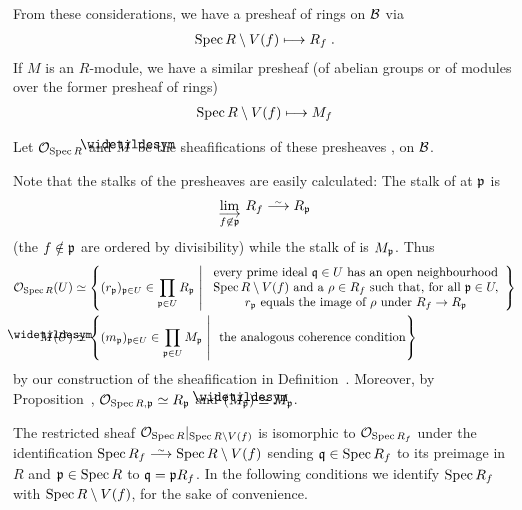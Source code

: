 \documentclass[a4paper,parskip=half,numbers=enddot, DIV=12]{scrreprt}
\begin{document}
From these considerations, we have a presheaf of rings on $\mathcal{B}$ via
\begin{align}\lbl{eq:SpecRingLoc}
    \Spec R\setminus V(f) \longmapsto R_f\;.
\end{align}
If $M$ is an $R$-module, we have a similar presheaf (of abelian groups or of modules over the former presheaf of rings)
\begin{align} \lbl{eq:SpecModuleLoc}
    \Spec R\setminus V(f) \longmapsto M_f
\end{align}
\begin{defi}
    Let $\mathcal{O}_{\operatorname{Spec} R}$ and $\snake M$ be the sheafifications of these presheaves ,  on $\mathcal{B}$.
\end{defi}
\begin{rem*}
    Note that the stalks of the presheaves are easily calculated: The stalk of  at $\mathfrak{p}$ is 
    \begin{align*}
        \colimit[f\not \in \pp] R_f \isomorphism R_\pp
    \end{align*}
    (the $f\notin\mathfrak{p}$ are ordered by divisibility) while the stalk of  is $M_{\mathfrak{p}}$. Thus
    \begin{align*}
        \Oo_{\Spec R}(U) &\simeq \left\{(r_\pp)_{\pp\in U}\in \prod_{\pp\in U} R_\pp \st
        \begin{array}{c}
	         \text{every prime ideal } \qq\in U \text{ has an open neighbourhood}\\
	         \Spec R\setminus V(f) \text{ and a } \rho \in R_f\text{ such that, for all }\pp\in U,
	          \\r_\pp\text{ equals the image of } \rho \text{ under } R_f\morphism R_\pp
        \end{array}\right\}\\        
        \snake M(U) &\simeq \left\{(m_\pp)_{\pp\in U}\in \prod_{\pp\in U} M_\pp \st\text{ the analogous coherence condition}\right\}
    \end{align*}
    by our construction of the sheafification in Definition~. Moreover, by Proposition~, $\mathcal{O}_{\operatorname{Spec} R,\mathfrak{p}}\simeq R_{\mathfrak{p}}$ and $(\snake M_\pp)\simeq M_\pp$.
\end{rem*}
\begin{fact}
    The restricted sheaf $\mathcal{O}_{\operatorname{Spec} R}|_{\operatorname{Spec} R\setminus V(f)}$ is isomorphic to $\mathcal{O}_{\operatorname{Spec} R_f}$ under the identification $\Spec R_f\isomorphism \Spec R\setminus V(f)$ sending $\mathfrak{q}\in \operatorname{Spec} R_f$ to its preimage in $R$ and $\mathfrak{p}\in \operatorname{Spec} R$ to $\mathfrak{q} = \mathfrak{p} R_f$. In the following conditions we identify $\operatorname{Spec} R_f$ with $\operatorname{Spec} R\setminus V(f)$, for the sake of convenience.
\end{fact}
\end{document}
